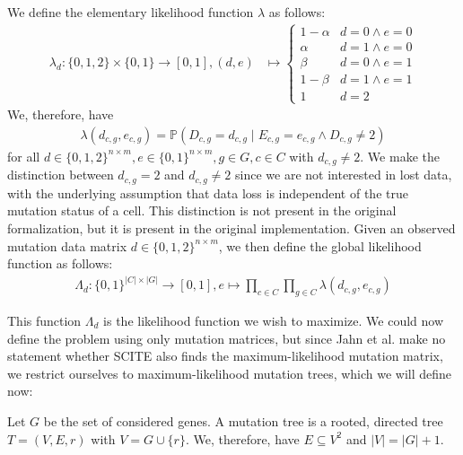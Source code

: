 \begin{definition}
    \label{def:likelihood}
    We define the elementary likelihood function $\lambda$ as follows:
    \begin{align*}
        \lambda_d: \{0, 1, 2\} \times \{0, 1\} \rightarrow [0, 1], (d, e) &\mapsto \begin{cases}
            1-\alpha & d = 0 \wedge e = 0 \\
            \alpha & d = 1 \wedge e = 0 \\
            \beta & d = 0 \wedge e = 1 \\
            1-\beta & d = 1 \wedge e = 1 \\
            1 & d = 2
        \end{cases}
    \end{align*}
    We, therefore, have 
    \begin{align*}
        \lambda(d_{c,g}, e_{c,g}) = \mathbb{P}(D_{c,g} = d_{c,g} \mid E_{c,g} = e_{c,g} \wedge D_{c,g} \neq 2)
    \end{align*}
    for all $d \in \{0,1,2\}^{n \times m}, e \in \{0,1\}^{n \times m}, g \in G, c \in C$ with $d_{c,g} \neq 2$. We make the distinction between $d_{c,g} = 2$ and $d_{c,g} \neq 2$ since we are not interested in lost data, with the underlying assumption that data loss is independent of the true mutation status of a cell. This distinction is not present in the original formalization, but it is present in the original implementation. Given an observed mutation data matrix $d \in \{0,1,2\}^{n \times m}$, we then define the global likelihood function as follows:
    \begin{align*}
        \Lambda_d : \{0,1\}^{|C| \times |G|} \rightarrow [0,1], e \mapsto \prod_{c \in C} \prod_{g \in C} \lambda(d_{c,g}, e_{c,g})
    \end{align*}
\end{definition}

This function $\Lambda_d$ is the likelihood function we wish to maximize. We could now define the problem using only mutation matrices, but since Jahn et al. make no statement whether \ac{SCITE} also finds the maximum-likelihood mutation matrix, we restrict ourselves to maximum-likelihood mutation trees, which we will define now:

\begin{definition}
    \label{def:mutation_tree}
    Let $G$ be the set of considered genes. A mutation tree is a rooted, directed tree $T = (V, E, r)$ with $V = G \cup \{r\}$. We, therefore, have $E \subseteq V^2$ and $|V| = |G| + 1$.
\end{definition}

